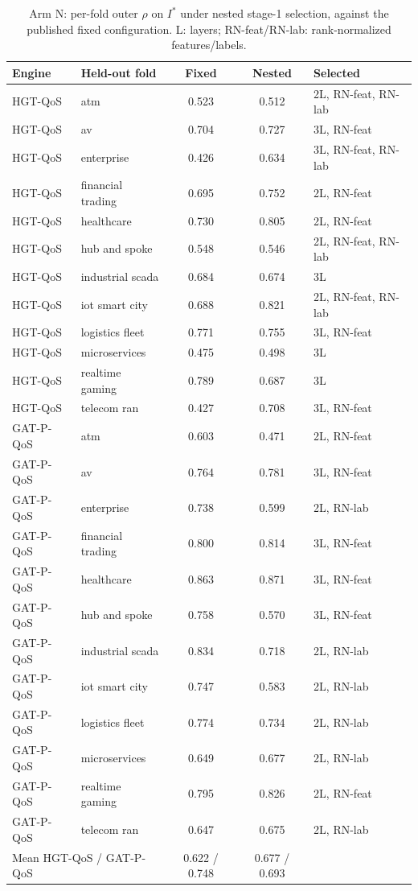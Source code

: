 \begin{table}[htbp]
\centering
\scriptsize
\caption{Arm N: per-fold outer $\rho$ on $I^*$ under nested stage-1 selection, against the published fixed configuration. L: layers; RN-feat/RN-lab: rank-normalized features/labels.}
\label{tab:r8-nested}
\begin{tabular}{llccl}
\toprule
Engine & Held-out fold & Fixed & Nested & Selected \\
\midrule
HGT-QoS & atm & 0.523 & 0.512 & 2L, RN-feat, RN-lab \\
HGT-QoS & av & 0.704 & 0.727 & 3L, RN-feat \\
HGT-QoS & enterprise & 0.426 & 0.634 & 3L, RN-feat, RN-lab \\
HGT-QoS & financial trading & 0.695 & 0.752 & 2L, RN-feat \\
HGT-QoS & healthcare & 0.730 & 0.805 & 2L, RN-feat \\
HGT-QoS & hub and spoke & 0.548 & 0.546 & 2L, RN-feat, RN-lab \\
HGT-QoS & industrial scada & 0.684 & 0.674 & 3L \\
HGT-QoS & iot smart city & 0.688 & 0.821 & 2L, RN-feat, RN-lab \\
HGT-QoS & logistics fleet & 0.771 & 0.755 & 3L, RN-feat \\
HGT-QoS & microservices & 0.475 & 0.498 & 3L \\
HGT-QoS & realtime gaming & 0.789 & 0.687 & 3L \\
HGT-QoS & telecom ran & 0.427 & 0.708 & 3L, RN-feat \\
GAT-P-QoS & atm & 0.603 & 0.471 & 2L, RN-feat \\
GAT-P-QoS & av & 0.764 & 0.781 & 3L, RN-feat \\
GAT-P-QoS & enterprise & 0.738 & 0.599 & 2L, RN-lab \\
GAT-P-QoS & financial trading & 0.800 & 0.814 & 3L, RN-feat \\
GAT-P-QoS & healthcare & 0.863 & 0.871 & 3L, RN-feat \\
GAT-P-QoS & hub and spoke & 0.758 & 0.570 & 3L, RN-feat \\
GAT-P-QoS & industrial scada & 0.834 & 0.718 & 2L, RN-lab \\
GAT-P-QoS & iot smart city & 0.747 & 0.583 & 2L, RN-lab \\
GAT-P-QoS & logistics fleet & 0.774 & 0.734 & 2L, RN-lab \\
GAT-P-QoS & microservices & 0.649 & 0.677 & 2L, RN-lab \\
GAT-P-QoS & realtime gaming & 0.795 & 0.826 & 2L, RN-feat \\
GAT-P-QoS & telecom ran & 0.647 & 0.675 & 2L, RN-lab \\
\midrule
\multicolumn{2}{l}{Mean HGT-QoS / GAT-P-QoS} & 0.622 / 0.748 & 0.677 / 0.693 & \\
\bottomrule
\end{tabular}
\end{table}


